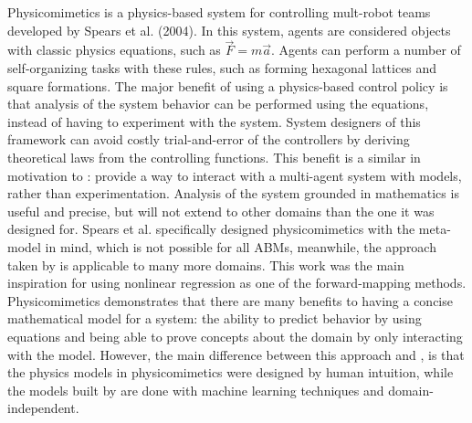 Physicomimetics is a physics-based system for controlling mult-robot teams developed by Spears et al. (2004)\nocite{spears2004dpb}.
In this system, agents are considered objects with classic physics equations, such as $\vec{F} = m \vec{a}$.
Agents can perform a number of self-organizing tasks with these rules, such as forming hexagonal lattices and square formations.
The major benefit of using a physics-based control policy is that analysis of the system behavior can be performed using the equations, instead of having to experiment with the system.
System designers of this framework can avoid costly trial-and-error of the controllers by deriving theoretical laws from the controlling functions.
This benefit is a similar in motivation to \fw: provide a way to interact with a multi-agent system with models, rather than experimentation.
Analysis of the system grounded in mathematics is useful and precise, but will not extend to other domains than the one it was designed for. 
Spears et al. specifically designed physicomimetics with the meta-model in mind, which is not possible for all ABMs, meanwhile, the approach taken by \fw is applicable to many more domains.
This work was the main inspiration for using nonlinear regression as one of the forward-mapping methods.
Physicomimetics demonstrates that there are many benefits to having a concise mathematical model for a system: the ability to predict behavior by using equations and being able to prove concepts about the domain by only interacting with the model.
However, the main difference between this approach and \fw, is that the physics models in physicomimetics were designed by human intuition,  while the models built by \fw are done with machine learning techniques and domain-independent.

